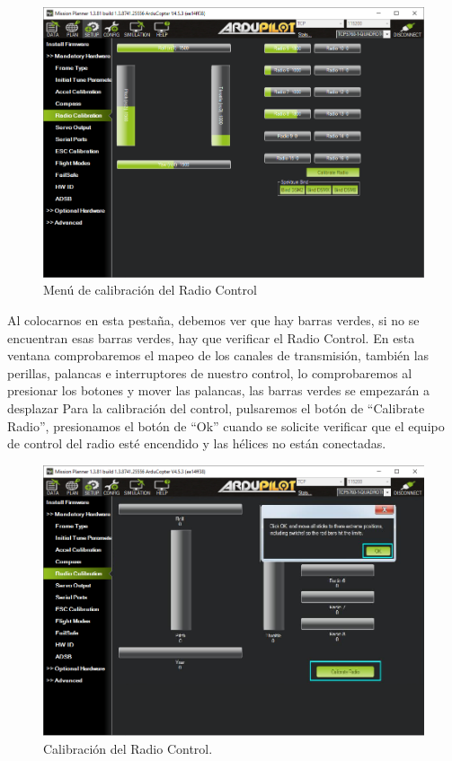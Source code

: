 \begin{figure}[H]
	\centering
	\includegraphics[width=0.8\linewidth]{imagenes/radioCont}
	\caption{Menú de calibración del Radio Control}
	\label{fig:radiocont}
\end{figure}

Al colocarnos en esta pestaña, debemos ver que hay barras verdes, si no se encuentran esas barras verdes, hay que verificar el Radio Control.
En esta ventana comprobaremos el mapeo de los canales de transmisión, también las perillas, palancas e interruptores de nuestro control, lo comprobaremos al presionar los botones y mover las palancas, las barras verdes se empezarán a desplazar
Para la calibración del control, pulsaremos el botón de “Calibrate Radio”, presionamos el botón de “Ok” cuando se solicite verificar que el equipo de control del radio esté encendido y las hélices no están conectadas.


\begin{figure}[H]
	\centering
	\includegraphics[width=\linewidth]{imagenes/contrCheck}
	\caption{Calibración del Radio Control.}
	\label{fig:contrcheck}
\end{figure}

